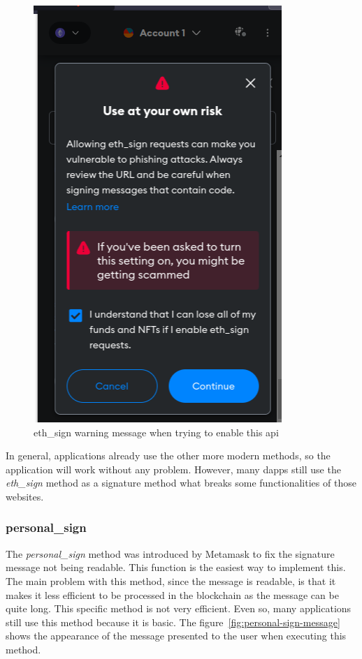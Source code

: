 \documentclass{iitFirstPage}
\begin{document}
    \begin{figure}[H]
        \centering
        \includegraphics[width=0.49 \linewidth]{signature/eth_sign_warning}
        \caption{eth\_sign warning message when trying to enable this \Gls{api}}
        \label{fig:eth-sign-warning}
    \end{figure}

    In general, applications already use the other more modern methods, so the application will work without any problem.
    However, many \Glspl{dapp} still use the \textit{eth\_sign} method as a signature method what breaks some functionalities of those websites.

    \clearpage

    \subsubsection{personal\_sign}

    The \textit{personal\_sign} method was introduced by Metamask to fix the signature message not being readable.
    This function is the easiest way to implement this.
    The main problem with this method, since the message is readable, is that it makes it less efficient to be processed in the blockchain as the message can be quite long.
    This specific method is not very efficient.
    Even so, many applications still use this method because it is basic.
    The figure~\ref{fig:personal-sign-message} shows the appearance of the message presented to the user when executing this method.
\end{document}
